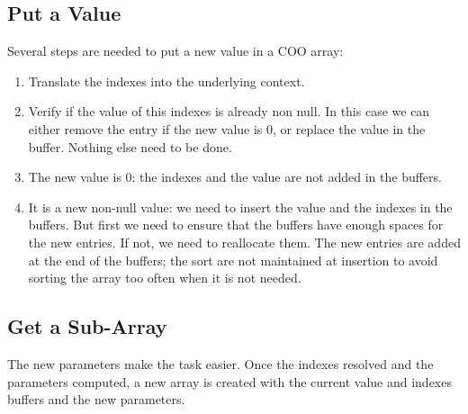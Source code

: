\subsection{Put a Value}

Several steps are needed to put a new value in a COO array:
\begin{enumerate}
	\item Translate the indexes into the underlying context.
	\item Verify if the value of this indexes is already non null. In this case we can either remove the entry if the new value is 0, or replace the value in the buffer. Nothing else need to be done.
	\item The new value is 0: the indexes and the value are not added in the buffers.
	\item It is a new non-null value: we need to insert the value and the indexes in the buffers. But first we need to ensure that the buffers have enough spaces for the new entries. If not, we need to reallocate them. The new entries are added at the end of the buffers; the sort are not maintained at insertion to avoid sorting the array too often when it is not needed.
\end{enumerate}

\subsection{Get a Sub-Array}

The new parameters make the task easier. Once the indexes resolved and the parameters computed, a new array is created with the current value and indexes buffers and the new parameters. 
